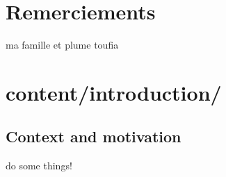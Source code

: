 \documentclass[english]{spimubphdthesis}
\begin{document}
\chapter*{Remerciements}
 ma famille  et plume toufia 
\tableofcontents

\mainmatter
 


\chapter{content/introduction/}
  
\section{Context and motivation}


\begin{emphbox}
	do some things!
\end{emphbox}





\end{document}
